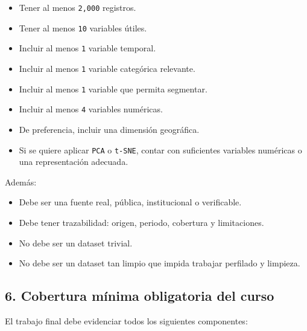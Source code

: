 \documentclass[
]{article}
\providecommand{\tightlist}{%
  \setlength{\itemsep}{0pt}\setlength{\parskip}{0pt}}
\begin{document}
\begin{itemize}
\tightlist
\item
  Tener al menos \texttt{2,000} registros.
\item
  Tener al menos \texttt{10} variables útiles.
\item
  Incluir al menos \texttt{1} variable temporal.
\item
  Incluir al menos \texttt{1} variable categórica relevante.
\item
  Incluir al menos \texttt{1} variable que permita segmentar.
\item
  Incluir al menos \texttt{4} variables numéricas.
\item
  De preferencia, incluir una dimensión geográfica.
\item
  Si se quiere aplicar \texttt{PCA} o \texttt{t-SNE}, contar con
  suficientes variables numéricas o una representación adecuada.
\end{itemize}

Además:

\begin{itemize}
\tightlist
\item
  Debe ser una fuente real, pública, institucional o verificable.
\item
  Debe tener trazabilidad: origen, periodo, cobertura y limitaciones.
\item
  No debe ser un dataset trivial.
\item
  No debe ser un dataset tan limpio que impida trabajar perfilado y
  limpieza.
\end{itemize}

\subsection{6. Cobertura mínima obligatoria del
curso}\label{6-cobertura-muxednima-obligatoria-del-curso}

El trabajo final debe evidenciar todos los siguientes componentes:
\end{document}
